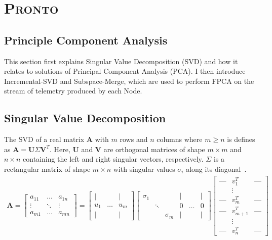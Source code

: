\section{\protect\textsc{Pronto}}

\subsection{Principle Component Analysis}
This section first explains Singular Value Decomposition (SVD) and how it
relates to solutions of Principal Component Analysis (PCA). I then introduce
Incremental-SVD and Subspace-Merge, which are used to perform FPCA on the stream
of telemetry produced by each Node.

\subsection{Singular Value Decomposition}
The SVD of a real matrix $\mathbf{A}$ with $m$ rows and $n$ columns where $m
\geq n$ is defines as $\mathbf{A} = \mathbf{U}\Sigma\mathbf{V}^T$. Here, $\mathbf{U}$ and
$\mathbf{V}$ are orthogonal matrices of shape $m \times m$ and $n \times n$
containing the left and right singular vectors, respectively. $\Sigma$ is a
rectangular matrix of shape $m \times n$ with singular values $\sigma_i$ along
its diagonal~\cite{Strang2009}.
\begin{align}
\mathbf{A} = \begin{bmatrix} a_{11} & \dots & a_{1n} \\ \vdots & \ddots & \vdots
    \\ a_{m1} & \dots & a_{mn} \end{bmatrix} = \begin{bmatrix} \mid & & \mid \\ u_1 & \ldots & u_m
\\ \mid & & \mid  \end{bmatrix} \begin{bmatrix} \sigma_1 & &  & \mid & & \mid \\ &
\ddots & & 0 & \ldots & 0 \\ & & \sigma_m & \mid & & \mid  \end{bmatrix} \begin{bmatrix}
    \text{---} & v_1^T & \text{---} \\ & \vdots & \\ \text{---} & v_m^T & \text{---} \\
    \text{---} & v_{m+1}^T & \text{---} \\ & \vdots  & \\ \text{---} & v_n^T & \text{---}
\end{bmatrix}
\end{align}

